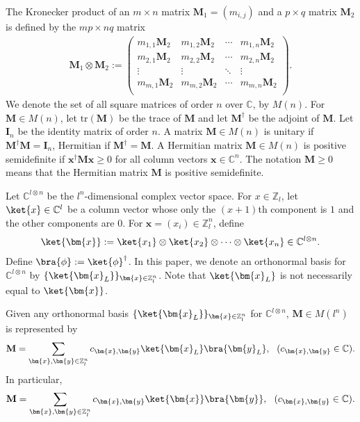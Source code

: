 \documentclass[reprint,amsmath,amssymb,aps,]{revtex4-2}
\theoremstyle{definition}
\newcommand{\SET}[1]{\mathbb{#1}}
\newcommand{\Z}{\SET{Z}}
\newcommand{\C}{\SET{C}}
\newcommand{\1}{\mbox{1}\hspace{-0.25em}\mbox{l}}%
\newcommand{\mat}[1]{\mathbf{#1}}
\newcommand{\pure}[2]{\C^{#1 \otimes #2}}
\begin{document}
The Kronecker product of
an $m \times n$ matrix $\mat{M}_1=(m_{i,j})$ and a $p \times q$ matrix $\mat{M}_2$
is defined by
the $mp \times nq$ matrix
\begin{align*}
  \mat{M}_1 \otimes \mat{M}_2
  :=
  \begin{pmatrix}
    m_{1,1}\mat{M}_2 & m_{1,2}\mat{M}_2 & \cdots & m_{1,n}\mat{M}_2\\
    m_{2,1}\mat{M}_2 & m_{2,2}\mat{M}_2 & \cdots & m_{2,n}\mat{M}_2\\
    \vdots & \vdots & \ddots & \vdots\\
    m_{m,1}\mat{M}_2 & m_{m,2}\mat{M}_2 & \cdots & m_{m,n}\mat{M}_2\\
  \end{pmatrix}.
\end{align*}
We denote the set of all square matrices of order $n$ over $\C$, by $M(n)$.
For $\mat{M} \in M(n)$,
let $\text{tr}(\mat{M})$ be
the trace of $\mat{M}$
and
let $\mat{M}^{\dagger}$ be
the adjoint of $\mat{M}$.
Let $\mat{I}_n$ be
the identity matrix of order $n$.
A matrix $\mat{M} \in M(n)$ is unitary
if $\mat{M}^\dagger \mat{M} = \mat{I}_n$,
Hermitian
if $\mat{M}^\dagger = \mat{M}$.
A Hermitian matrix $\mat{M} \in M(n)$ is positive semidefinite
if $\bm{x}^\dagger \mat{M} \bm{x} \ge 0$
for all column vectors $\bm{x} \in \C^n$.
The notation $\mat{M} \ge 0$
means that
the Hermitian matrix $\mat{M}$
is
positive semidefinite.

Let $\pure{l}{n}$ be
the $l^n$-dimensional complex vector space.
For $x \in \mathbb{Z}_l$,
let $\ket{x} \in \C^l$ be a column vector
whose only the $(x+1)$th component is $1$ and the other components are $0$.
For $\bm{x} = (x_i) \in \mathbb{Z}_l^n$,
define
\begin{align*}
  \ket{\bm{x}}
  :=
  \ket{x_1} \otimes \ket{x_2} \otimes \cdots \otimes \ket{x_n} 
  \in
  \pure{l}{n}.
\end{align*}
Define
$\bra{\phi} := \ket{\phi}^{\dagger}$.
In this paper,
we denote an orthonormal basis for $\pure{l}{n}$
by $\{ \ket{ \bm{x}_L } \}_{ \bm{x} \in \Z_l^n }$.
Note that
$\ket{ \bm{x}_L }$ is not necessarily equal to $\ket{\bm{x}}$.

Given
any orthonormal basis $\{ \ket{ \bm{x}_L } \}_{ \bm{x} \in \Z_l^n }$ for $\pure{l}{n}$,
$\mat{M} \in M(l^n)$ is represented by
\begin{align}
  \mat{M}
  =
  \sum_{\bm{x},\bm{y} \in \Z_l^n}
  c_{\bm{x},\bm{y}}
  \ket{\bm{x}_L}\bra{\bm{y}_L}
  ,~~(c_{\bm{x}, \bm{y}} \in \C).
  \label{eq:orth_basis_xL}
\end{align}
In particular, 
\begin{align}
  \mat{M}
  =
  \sum_{\bm{x},\bm{y} \in \Z_l^n}
  c_{\bm{x},\bm{y}}
  \ket{\bm{x}}\bra{\bm{y}}
  ,~~(c_{\bm{x}, \bm{y}} \in \C).
  \label{eq:orth_basis_x}
\end{align}
\end{document}
